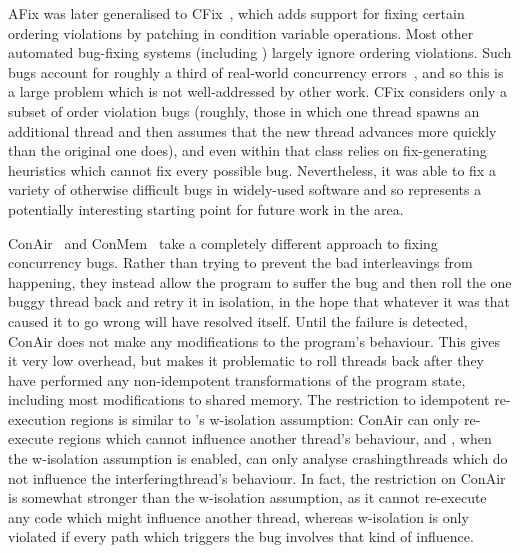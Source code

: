 AFix was later generalised to CFix~\cite{Jin2012}, which adds support
for fixing certain ordering violations by patching in condition
variable operations.  Most other automated bug-fixing systems
(including {\technique}) largely ignore ordering violations.  Such
bugs account for roughly a third of real-world concurrency
errors~\cite{Lu2008}, and so this is a large problem which is not
well-addressed by other work.  CFix considers only a subset of order
violation bugs (roughly, those in which one thread spawns an
additional thread and then assumes that the new thread advances more
quickly than the original one does), and even within that class relies
on fix-generating heuristics which cannot fix every possible bug.
Nevertheless, it was able to fix a variety of otherwise difficult bugs
in widely-used software and so represents a potentially interesting
starting point for future work in the area.

ConAir~\cite{Zhang2013} and ConMem~\cite{Zhang2010} take a completely
different approach to fixing concurrency bugs.  Rather than trying to
prevent the bad interleavings from happening, they instead allow the
program to suffer the bug and then roll the one buggy thread back and
retry it in isolation, in the hope that whatever it was that caused it
to go wrong will have resolved itself.  Until the failure is detected,
ConAir does not make any modifications to the program's behaviour.
This gives it very low overhead, but makes it problematic to roll
threads back after they have performed any non-idempotent
transformations of the program state, including most modifications to
shared memory.  The restriction to idempotent re-execution regions is
similar to {\technique}'s \gls{w-isolation} assumption: ConAir can
only re-execute regions which cannot influence another thread's
behaviour, and {\technique}, when the \gls{w-isolation} assumption is
enabled, can only analyse \glspl{crashingthread} which do not
influence the \gls{interferingthread}'s behaviour.  In fact, the
restriction on ConAir is somewhat stronger than the \gls{w-isolation}
assumption, as it cannot re-execute any code which might influence
another thread, whereas \gls{w-isolation} is only violated if every
path which triggers the bug involves that kind of influence.

